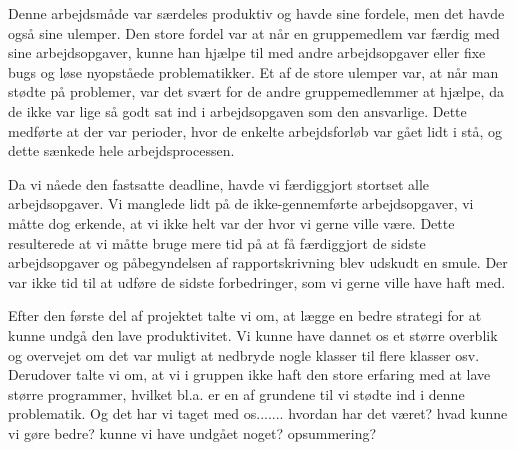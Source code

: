 Denne arbejdsmåde var særdeles produktiv og havde sine fordele, men det havde også sine ulemper. Den store fordel var at når en gruppemedlem var færdig med sine arbejdsopgaver, kunne han hjælpe til med andre arbejdsopgaver eller fixe bugs og løse nyopståede problematikker. Et af de store ulemper var, at når man stødte på problemer, var det svært for de andre gruppemedlemmer at hjælpe, da de ikke var lige så godt sat ind i arbejdsopgaven som den ansvarlige. Dette medførte at der var perioder, hvor de enkelte arbejdsforløb var gået lidt i stå, og dette sænkede hele arbejdsprocessen. 

Da vi nåede den fastsatte deadline, havde vi færdiggjort stortset alle arbejdsopgaver. Vi manglede lidt på de ikke-gennemførte arbejdsopgaver, vi måtte dog erkende, at vi ikke helt var der hvor vi gerne ville være. Dette resulterede at vi måtte bruge mere tid på at få færdiggjort de sidste arbejdsopgaver og påbegyndelsen af rapportskrivning blev udskudt en smule. Der var ikke tid til at udføre de sidste forbedringer, som vi gerne ville have haft med. 

Efter den første del af projektet talte vi om, at lægge en bedre strategi for at kunne undgå den lave produktivitet. Vi kunne have dannet os et større overblik og overvejet om det var muligt at nedbryde nogle klasser til flere klasser osv. Derudover talte vi om, at vi i gruppen ikke haft den store erfaring med at lave større programmer, hvilket bl.a. er en af grundene til  vi stødte ind i denne problematik. 
Og det har vi taget med os.......
hvordan har det været?
hvad kunne vi gøre bedre?
kunne vi have undgået noget?
opsummering?